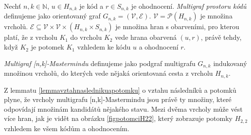 \begin{definice}
  Nechť $n, k\in \mathbb{N}$, $u\in H_{n,k}$ je kód a $r\in S_{n,k}$ je ohodnocení. \emph{Multigraf prostoru kódů} definujeme jako orientovaný graf $G_{n,k} = (\mathcal{V}, \mathcal{E})$. $\mathcal{V} = \mathcal{P}(H_{n,k})$ je množina vrcholů. $\mathcal{E} \subseteq \mathcal{V} \times \mathcal{V} \times (H_{n,k}\times S_{n,k})$ je množina hran s obarveními, pro kterou platí, že z vrcholu $K_1$ do vrcholu $K_2$ vede hrana obarvená $(u,r)$, právě tehdy, když $K_2$ je potomek $K_1$ vzhledem ke kódu $u$ a ohodnocení $r$. 
\end{definice}


\begin{definice}
  \emph{Multigraf [n,k]-Mastermindu} definujeme jako podgraf multigrafu $G_{n,k}$ indukovaný množinou vrcholů, do kterých vede nějaká orientovaná cesta z vrcholu $H_{n,k}$. 
  
\end{definice}
Z lemmatu \ref{lemmavztahnaslednikuapotomku} o vztahu následníků a potomků plyne, že vrcholy multigrafu [n,k]-Mastermindu jsou právě ty množiny, které odpovídají množinám kandidátů nějakého stavu. Mezi dvěma vrcholy může vést více hran, jak je vidět na obrázku \ref{figpotomciH22}, který zobrazuje potomky $H_{2,2}$ vzhledem ke všem kódům a ohodnocením. 


